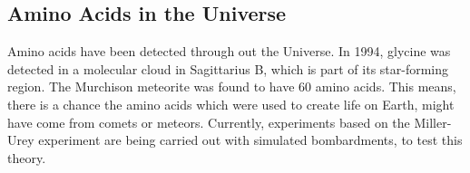 \documentclass[12pt]{article}
\begin{document}
	\subsection{Amino Acids in the Universe}
	Amino acids have been detected through out the Universe.
	In 1994, glycine was detected in a molecular cloud in Sagittarius B, which is part of its star-forming region.
	The Murchison meteorite was found to have 60 amino acids.
	This means, there is a chance the amino acids which were used to create life on Earth, might have come from comets or meteors.
	Currently, experiments based on the Miller-Urey experiment are being carried out with simulated bombardments, to test this theory.
\end{document}
